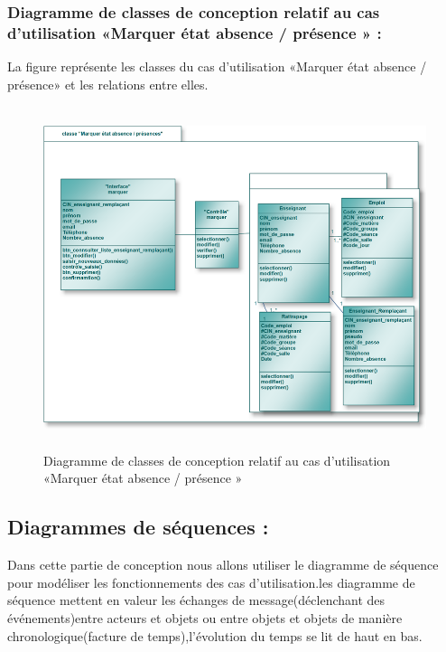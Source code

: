 \documentclass[12 pt ]{report}
\begin{document}
\subsubsection{Diagramme de classes de conception relatif au cas d’utilisation «Marquer état absence / présence » :}
La figure  représente les classes du cas d’utilisation «Marquer état absence / présence» et les relations entre elles.
\begin{figure}[h]
 \begin{center}
\includegraphics[width= 14 cm ,height=10cm]{cma.PNG}
\caption{Diagramme de classes de conception relatif au cas d’utilisation «Marquer état absence / présence » }

\end{center}
\end{figure}
\subsection{Diagrammes de séquences :}
Dans cette partie de conception nous allons utiliser le diagramme de séquence pour modéliser les fonctionnements des cas d'utilisation.les diagramme de séquence mettent en valeur les échanges de message(déclenchant des événements)entre acteurs et objets ou entre objets et objets de manière chronologique(facture de temps),l'évolution du temps se lit de haut en bas.
\end{document}
